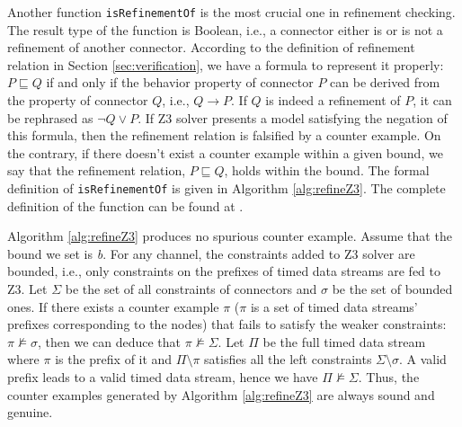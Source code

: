\documentclass[preprint,3p]{elsarticle}
\begin{document}
Another function \texttt{isRefinementOf} is the most crucial one in refinement checking. The result type of the function is Boolean, i.e., a connector either is or is not a refinement of another connector. According to the definition of refinement relation in Section \ref{sec:verification}, we have a formula to represent it properly: $P \sqsubseteq Q$ if and only if the behavior property of connector $P$ can be derived from the property of connector $Q$, i.e., $Q \rightarrow P$. If $Q$ is indeed a refinement of $P$, it can be rephrased as $\neg Q \vee P$. If Z3 solver presents a model satisfying the negation of this formula, then the refinement relation is falsified by a counter example. On the contrary, if there doesn't exist a counter example within a given bound, we say that the refinement relation, $P\sqsubseteq Q$, holds within the bound.
The formal definition of \texttt{isRefinementOf} is given in Algorithm \ref{alg:refineZ3}. The complete definition of the function can be found at \cite{reo2coq2Z3}.

 Algorithm \ref{alg:refineZ3} produces no spurious counter example.
Assume that the bound we set is \emph{b}. For any channel, the constraints added to Z3 solver are bounded, i.e., only constraints on the prefixes of timed data streams are fed to Z3. Let $\Sigma$ be the set of all constraints of connectors and $\sigma$ be the set of bounded ones. If there exists a counter example $\pi$ ($\pi$ is a set of timed data streams' prefixes  corresponding to the nodes) that fails to satisfy the weaker constraints: $\pi \nvDash \sigma$, then we can deduce that $\pi \nvDash \Sigma$. Let $\Pi$ be the full timed data stream where $\pi$ is the prefix of it and $\Pi \setminus \pi$ satisfies all the left constraints $\Sigma \setminus \sigma$.
A valid prefix leads to a valid timed data stream, hence we have $\Pi \nvDash \Sigma$.
Thus, the counter examples generated by Algorithm \ref{alg:refineZ3} are always sound and genuine.
\end{document}
